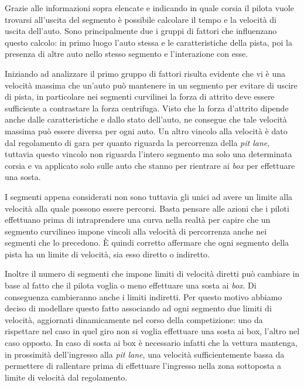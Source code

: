 Grazie alle informazioni sopra elencate e indicando in quale corsia il pilota vuole trovarsi all'uscita del segmento è possibile calcolare il tempo e la velocità di uscita dell'auto. Sono principalmente due i gruppi di fattori che influenzano questo calcolo: in primo luogo l'auto stessa e le caratteristiche della pista, poi la presenza di altre auto nello stesso segmento e l'interazione con esse.

Iniziando ad analizzare il primo gruppo di fattori risulta evidente che vi è una velocità massima che un'auto può mantenere in un segmento per evitare di uscire di pista, in particolare nei segmenti curvilinei la forza di attrito deve essere sufficiente a contrastare la forza centrifuga.
Visto che la forza d'attrito dipende anche dalle caratteristiche e dallo stato dell'auto, ne consegue che tale velocità massima può essere diversa per ogni auto.
Un altro vincolo alla velocità è dato dal regolamento di gara per quanto riguarda la percorrenza della \textit{pit lane}, tuttavia questo vincolo non riguarda l'intero segmento ma solo una determinata corsia e va applicato solo sulle auto che stanno per rientrare ai \textit{box} per effettuare una sosta.

I segmenti appena considerati non sono tuttavia gli unici ad avere un limite alla velocità alla quale possono essere percorsi. Basta pensare alle azioni che i piloti effettuano prima di intraprendere una curva nella realtà per capire che un segmento curvilineo impone vincoli alla velocità di percorrenza anche nei segmenti che lo precedono. \`E quindi corretto affermare che ogni segmento della pista ha un limite di velocità, sia esso diretto o indiretto.

Inoltre il numero di segmenti che impone limiti di velocità diretti può cambiare in base al fatto che il pilota voglia o meno effettuare una sosta ai \textit{box}. Di conseguenza cambieranno anche i limiti indiretti. Per questo motivo abbiamo deciso di modellare questo fatto associando ad ogni segmento due limiti di velocità, aggiornati dinamicamente nel corso della competizione: uno da rispettare nel caso in quel giro non si voglia effettuare una sosta ai box, l'altro nel caso opposto. In caso di sosta ai box è necessario infatti che la vettura mantenga, in prossimità dell'ingresso alla \textit{pit lane}, una velocità sufficientemente bassa da permettere di rallentare prima di effettuare l'ingresso nella zona sottoposta a limite di velocità dal regolamento.

